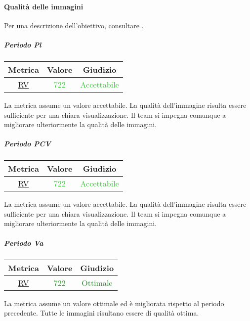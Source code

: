 					\newpage
					
			\paragraph{Qualità delle immagini}
				Per una descrizione dell'obiettivo, consultare .
				\subparagraph{Periodo Pl}
				\begin{table}[H]
					\centering
					\begin{tabular}{  c | c | c}
						\hline
						\textbf{Metrica} & \textbf{Valore} & \textbf{Giudizio} \\
						\hline
						 \hyperref[MMC]{RV}   & \textcolor{LimeGreen}{722}          & \textcolor{LimeGreen}{Accettabile} \\ \hline
					\end{tabular} 
				\end{table}
					La metrica assume un valore accettabile. La qualità dell'immagine risulta essere sufficiente per una chiara visualizzazione. Il team si impegna comunque a migliorare ulteriormente la qualità delle immagini.
				
				\subparagraph{Periodo PCV}
				\begin{table}[H]
					\centering
					\begin{tabular}{  c | c | c}
						\hline
						\textbf{Metrica} & \textbf{Valore} & \textbf{Giudizio} \\
						\hline
						\hyperref[MMC]{RV}   & \textcolor{LimeGreen}{722}          & \textcolor{LimeGreen}{Accettabile} \\ \hline
					\end{tabular} 
				\end{table}
				La metrica assume un valore accettabile. La qualità dell'immagine risulta essere sufficiente per una chiara visualizzazione. Il team si impegna comunque a migliorare ulteriormente la qualità delle immagini.
				
				\subparagraph{Periodo Va}
				\begin{table}[H]
					\centering
					\begin{tabular}{  c | c | c}
						\hline
						\textbf{Metrica} & \textbf{Valore} & \textbf{Giudizio} \\
						\hline
						\hyperref[MMC]{RV}   & \textcolor{ForestGreen}{722}          & \textcolor{ForestGreen}{Ottimale} \\ \hline
					\end{tabular} 
				\end{table}
				La metrica assume un valore ottimale ed è migliorata rispetto al periodo precedente. Tutte le immagini risultano essere di qualità ottima.
				
